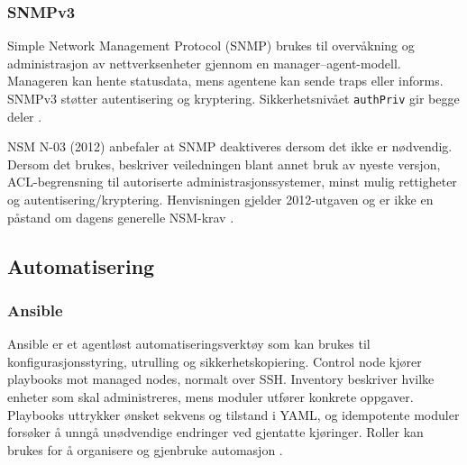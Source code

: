 \subsubsection{SNMPv3}

Simple Network Management Protocol (SNMP) brukes til overvåkning og administrasjon av nettverksenheter gjennom en manager--agent-modell. Manageren kan hente statusdata, mens agentene kan sende traps eller informs. SNMPv3 støtter autentisering og kryptering. Sikkerhetsnivået \texttt{authPriv} gir begge deler \cite{cisco_snmp_security}.

NSM N-03 (2012) anbefaler at SNMP deaktiveres dersom det ikke er nødvendig. Dersom det brukes, beskriver veiledningen blant annet bruk av nyeste versjon, ACL-begrensning til autoriserte administrasjonssystemer, minst mulig rettigheter og autentisering/kryptering. Henvisningen gjelder 2012-utgaven og er ikke en påstand om dagens generelle NSM-krav \cite{nsm_n03}.

\subsection{Automatisering}

\subsubsection{Ansible}

Ansible er et agentløst automatiseringsverktøy som kan brukes til konfigurasjonsstyring, utrulling og sikkerhetskopiering. Control node kjører playbooks mot managed nodes, normalt over SSH. Inventory beskriver hvilke enheter som skal administreres, mens moduler utfører konkrete oppgaver. Playbooks uttrykker ønsket sekvens og tilstand i YAML, og idempotente moduler forsøker å unngå unødvendige endringer ved gjentatte kjøringer. Roller kan brukes for å organisere og gjenbruke automasjon \cite{ansible}.

